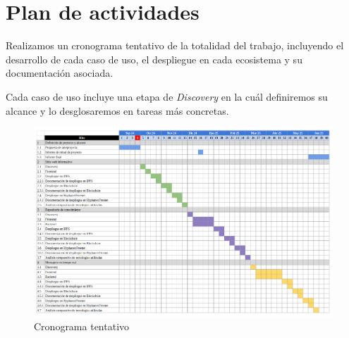 \section{Plan de actividades}

Realizamos un cronograma tentativo de la totalidad del trabajo, incluyendo el desarrollo de cada caso de uso, el despliegue en cada ecosistema y su documentación asociada.

Cada caso de uso incluye una etapa de \textit{Discovery} en la cuál definiremos su alcance y lo desglosaremos en tareas más concretas.

\begin{figure}[H]
    \includegraphics[width=1\linewidth]{img/cronograma.png}
    \caption{Cronograma tentativo}
    \label{fig:enter-label}
\end{figure}

